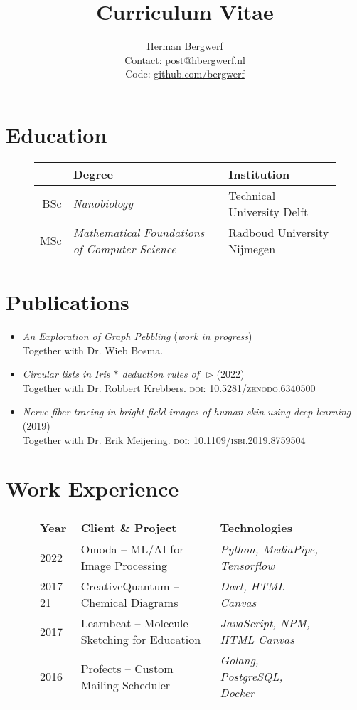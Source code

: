 \documentclass[a4paper,12pt]{article}
\date{}
\title{Curriculum Vitae}
\author{Herman Bergwerf\\%
{\small Contact: \url{post@hbergwerf.nl}}\\%
{\small Code: \url{github.com/bergwerf}}}
\begin{document}
\maketitle

\section*{Education}

\begin{figure}[h]
\centering
\begin{tabular}{rll}
\toprule
& {\bf Degree} & {\bf Institution}\\
\midrule
BSc & \emph{Nanobiology} & Technical University Delft\\
MSc & \emph{Mathematical Foundations of Computer Science} & Radboud University Nijmegen\\
\bottomrule
\end{tabular}
\end{figure}

\section*{Publications}

\begin{itemize}[--,labelsep=3mm,leftmargin=*]
\item \emph{An Exploration of Graph Pebbling} (\emph{work in progress})\\
Together with Dr. Wieb Bosma.
\item \emph{Circular lists in Iris $\ast$ deduction rules of~\,$\triangleright$} (2022)\\
Together with Dr. Robbert Krebbers. \textsc{\href{https://doi.org/10.5281/zenodo.6340500}{doi: 10.5281/zenodo.6340500}}
\item \emph{Nerve fiber tracing in bright-field images of human skin using deep learning} (2019)\\
Together with Dr. Erik Meijering. \textsc{\href{https://ieeexplore.ieee.org/document/8759504}{doi: 10.1109/isbi.2019.8759504}}
\end{itemize}

\section*{Work Experience}

\begin{figure}[h]
\centering
\begin{tabular}{llll}
\toprule
{\bfseries Year} & {\bfseries Client \& Project} & {\bfseries Technologies}\\
\midrule
2022 & Omoda -- ML/AI for Image Processing & \emph{Python, MediaPipe, Tensorflow}\\
2017-21 & CreativeQuantum -- Chemical Diagrams & \emph{Dart, HTML Canvas}\\
2017 & Learnbeat -- Molecule Sketching for Education & \emph{JavaScript, NPM, HTML Canvas}\\
2016 & Profects -- Custom Mailing Scheduler & \emph{Golang, PostgreSQL, Docker}\\
\bottomrule
\end{tabular}
\end{figure}

\end{document}
